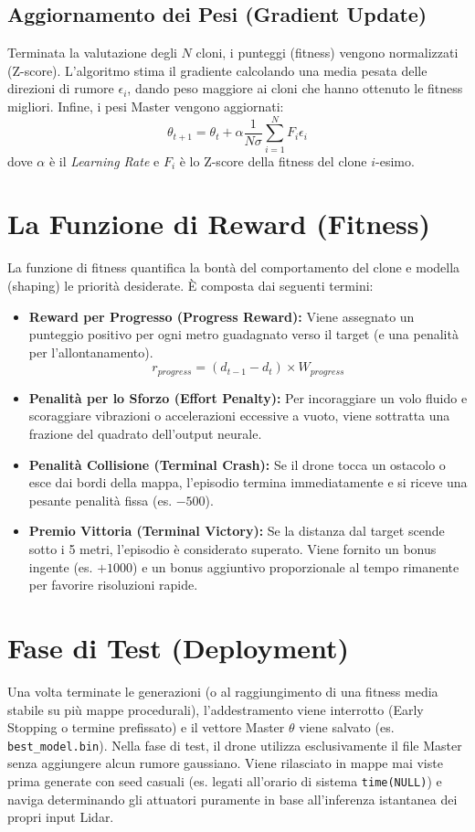 \documentclass[12pt,a4paper]{article}
\begin{document}
\subsection{Aggiornamento dei Pesi (Gradient Update)}
Terminata la valutazione degli $N$ cloni, i punteggi (fitness) vengono normalizzati (Z-score). L'algoritmo stima il gradiente calcolando una media pesata delle direzioni di rumore $\epsilon_i$, dando peso maggiore ai cloni che hanno ottenuto le fitness migliori. Infine, i pesi Master vengono aggiornati:
\begin{equation}
    \theta_{t+1} = \theta_t + \alpha \frac{1}{N \sigma} \sum_{i=1}^{N} F_i \epsilon_i
\end{equation}
dove $\alpha$ è il \textit{Learning Rate} e $F_i$ è lo Z-score della fitness del clone $i$-esimo.

\section{La Funzione di Reward (Fitness)}
La funzione di fitness quantifica la bontà del comportamento del clone e modella (shaping) le priorità desiderate. È composta dai seguenti termini:
\begin{itemize}
    \item \textbf{Reward per Progresso (Progress Reward):} Viene assegnato un punteggio positivo per ogni metro guadagnato verso il target (e una penalità per l'allontanamento).
    $$ r_{progress} = (d_{t-1} - d_{t}) \times W_{progress} $$
    \item \textbf{Penalità per lo Sforzo (Effort Penalty):} Per incoraggiare un volo fluido e scoraggiare vibrazioni o accelerazioni eccessive a vuoto, viene sottratta una frazione del quadrato dell'output neurale.
    \item \textbf{Penalità Collisione (Terminal Crash):} Se il drone tocca un ostacolo o esce dai bordi della mappa, l'episodio termina immediatamente e si riceve una pesante penalità fissa (es. $-500$).
    \item \textbf{Premio Vittoria (Terminal Victory):} Se la distanza dal target scende sotto i 5 metri, l'episodio è considerato superato. Viene fornito un bonus ingente (es. $+1000$) e un bonus aggiuntivo proporzionale al tempo rimanente per favorire risoluzioni rapide.
\end{itemize}

\section{Fase di Test (Deployment)}
Una volta terminate le generazioni (o al raggiungimento di una fitness media stabile su più mappe procedurali), l'addestramento viene interrotto (Early Stopping o termine prefissato) e il vettore Master $\theta$ viene salvato (es. \texttt{best\_model.bin}).
Nella fase di test, il drone utilizza esclusivamente il file Master senza aggiungere alcun rumore gaussiano. Viene rilasciato in mappe mai viste prima generate con seed casuali (es. legati all'orario di sistema \texttt{time(NULL)}) e naviga determinando gli attuatori puramente in base all'inferenza istantanea dei propri input Lidar.
\end{document}

